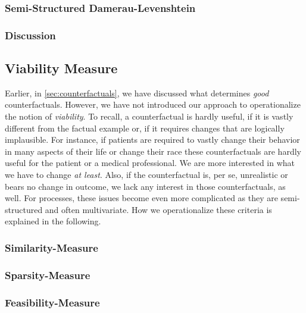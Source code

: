 \documentclass[runningheads]{llncs}
\begin{document}
\subsubsection{Semi-Structured Damerau-Levenshtein}


\subsubsection{Discussion}


\subsection{Viability Measure}
\label{sec:viability}
Earlier, in \autoref{sec:counterfactuals}, we have discussed what determines \emph{good} counterfactuals. However, we have not introduced our approach to operationalize the notion of \emph{viability}. To recall, a counterfactual is hardly useful, if it is vastly different from the factual example or, if it requires changes that are logically implausible. For instance, if patients are required to vastly change their behavior in many aspects of their life or change their race these counterfactuals are hardly useful for the patient or a medical professional. We are more interested in what we have to change \emph{at least}. Also, if the counterfactual is, per se, unrealistic or bears no change in outcome, we lack any interest in those counterfactuals, as well. For processes, these issues become even more complicated as they are semi-structured and often multivariate. How we operationalize these criteria is explained in the following.

\subsubsection{Similarity-Measure}
\label{sec:similarity}


\subsubsection{Sparsity-Measure}
\label{sec:sparcity}


\subsubsection{Feasibility-Measure}
\label{sec:feasibility}



\end{document}
